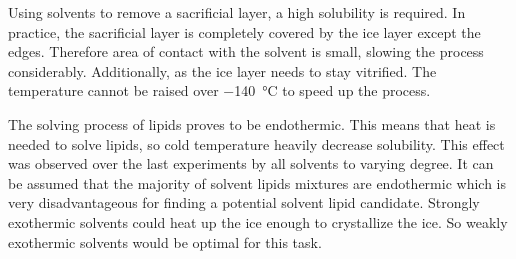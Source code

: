 Using solvents to remove a sacrificial layer, a high solubility is required. In practice, the sacrificial layer is completely covered by the ice layer except the edges. Therefore area of contact with the solvent is small, slowing the process considerably. Additionally, as the ice layer needs to stay vitrified. The temperature cannot be raised over \SI{-140}{\degreeCelsius} to speed up the process.

The solving process of lipids proves to be endothermic. This means that heat is needed to solve lipids, so cold temperature heavily decrease solubility. This effect was observed over the last experiments by all solvents to varying degree. It can be assumed that the majority of solvent lipids mixtures are endothermic which is very disadvantageous for finding a potential solvent lipid candidate. Strongly exothermic solvents could heat up the ice enough to crystallize the ice. So weakly exothermic solvents would be optimal for this task.



